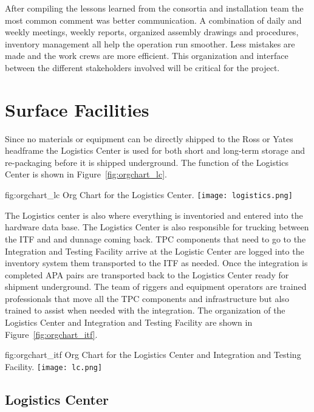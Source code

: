 After compiling the lessons learned from the consortia and installation team
 the most common comment was better
communication. A combination of daily and weekly meetings, weekly
reports, organized assembly drawings and procedures, inventory
management all help the operation run smoother. Less mistakes are made
and the work crews are more efficient.  This organization and
interface between the different stakeholders involved will be critical
for the project.

\section{Surface Facilities}

Since no materials or equipment can be directly shipped to the Ross or
Yates headframe the Logistics Center is used for both short and
long-term storage and re-packaging before it is shipped underground.
The function of the Logistics Center is shown in
Figure~\ref{fig:orgchart_lc}.
\begin{dunefigure}{fig:orgchart_lc}
  {Org Chart for the Logistics Center.}
  \texttt{[image: logistics.png]}
\end{dunefigure}
The Logistics center is also where everything is inventoried and
entered into the hardware data base.  The Logistics Center is also
responsible for trucking between the ITF and \surf and dunnage coming
back.  TPC components that need to go to the Integration and Testing
Facility arrive at the Logistic Center are logged into the inventory
system them transported to the ITF as needed. Once the integration is
completed APA pairs are transported back to the Logistics Center ready
for shipment underground.  The team of riggers and equipment operators
are trained professionals that move all the TPC components and
infrastructure but also trained to assist when needed with the
integration. The organization of the Logistics Center and Integration
and Testing Facility are shown in Figure~\ref{fig:orgchart_itf}.
\begin{dunefigure}{fig:orgchart_itf}
  {Org Chart for the Logistics Center and Integration and Testing
    Facility.}  \texttt{[image: lc.png]}
\end{dunefigure}

\subsection{Logistics Center}

